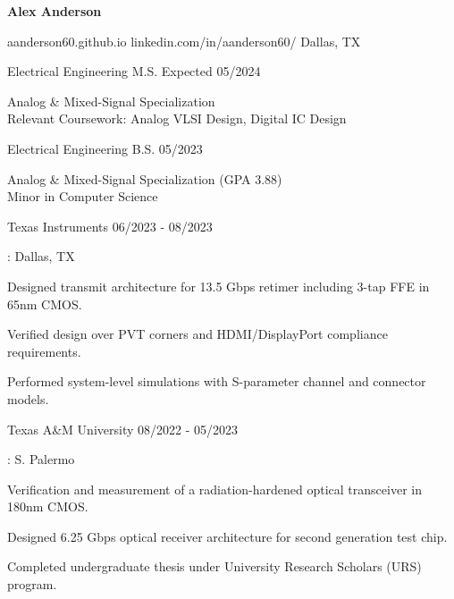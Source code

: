 \documentclass[11pt]{article}
\begin{document}
\centerline{{\Huge \bf Alex Anderson}}

\bigskip

        {aanderson60.github.io}
        {linkedin.com/in/aanderson60/}
        {Dallas, TX}


\begin{description}
\squish
{}
            {Electrical Engineering}
            {M.S. Expected 05/2024}

Analog \& Mixed-Signal Specialization \\
Relevant Coursework: Analog VLSI Design, Digital IC Design

            {Electrical Engineering}
            {B.S. 05/2023}

Analog \& Mixed-Signal Specialization (GPA 3.88)\\
Minor in Computer Science

\end{description}



\begin{description}
\squish
{}
            {Texas Instruments}
            {06/2023 - 08/2023}

\underline{}: Dallas, TX
            
\textbullet \space Designed transmit architecture for 13.5 Gbps retimer including 3-tap FFE in 65nm CMOS.

\textbullet \space Verified design over PVT corners and HDMI/DisplayPort compliance requirements.

\textbullet \space Performed system-level simulations with S-parameter channel and connector models.

        
\end{description}

\begin{description}
\squish
{}
            {Texas A\&M University}
            {08/2022 - 05/2023}

\underline{}: S. Palermo

\textbullet \space Verification and measurement of a radiation-hardened optical transceiver in 180nm CMOS.

\textbullet \space Designed 6.25 Gbps optical receiver architecture for second generation test chip.

\textbullet \space Completed undergraduate thesis under University Research Scholars (URS) program.


\end{description}
\end{document}
